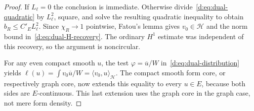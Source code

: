 \documentclass[11pt,a4paper]{article}
\numberwithin{equation}{section}
\theoremstyle{definition}\newtheorem{definition}[theorem]{Definition}
\theoremstyle{remark}\newtheorem{remark}[theorem]{Remark}
\newcommand{\Hh}{\mathcal H}\newcommand{\Hw}{\mathcal H}
\newcommand{\ip}[2]{\langle#1,#2\rangle}\newcommand{\norm}[1]{\lVert#1\rVert}\newcommand{\abs}[1]{\lvert#1\rvert}
\begin{document}
\begin{proof}
If $L_\ell=0$ the conclusion is immediate. Otherwise divide~\eqref{d:eq:dual-quadratic} by $L_\ell^2$, square, and solve the resulting quadratic inequality to obtain $b_R\le C'_E L_\ell^2$. Since $\chi_R\to1$ pointwise, Fatou's lemma gives $v_0\in\Hh$ and the norm bound in~\eqref{d:eq:dual-H-recovery}. The ordinary $H^1$ estimate was independent of this recovery, so the argument is noncircular.

For any even compact smooth $u$, the test $\varphi=\overline u/W$ in~\eqref{d:eq:dual-distribution} yields
$\ell(u)=\int v_0\overline u/W=\ip{v_0}{u}_{\Hh}$.
The compact smooth form core, or respectively graph core, now extends this equality to every $u\in E$, because both sides are $E$-continuous. This last extension uses the graph core in the graph case, not mere form density.
\end{proof}
\end{document}
